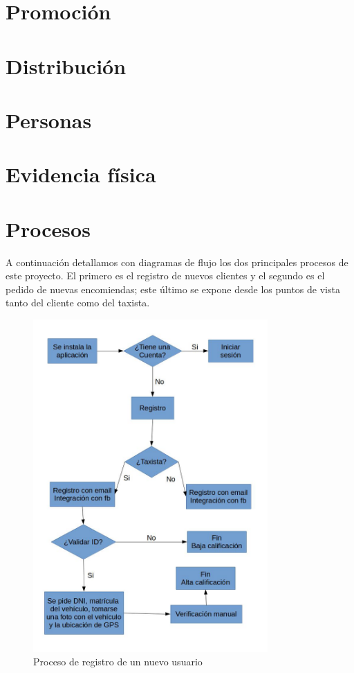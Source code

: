 \section{Promoción}

\section{Distribución}

\section{Personas}

\section{Evidencia física}

\section{Procesos}

A continuación detallamos con diagramas de flujo los dos principales procesos de este proyecto. El primero es el registro de nuevos clientes y el segundo es el pedido de nuevas encomiendas; este último se expone desde los puntos de vista tanto del cliente como del taxista.

\begin{figure}[htb]
\centering
\includegraphics[width=0.8\textwidth]{./img/proceso_registro_nuevo_usuario.jpg}
\caption{Proceso de registro de un nuevo usuario} \label{fig:proc_nuevo_usuario}
\end{figure}

